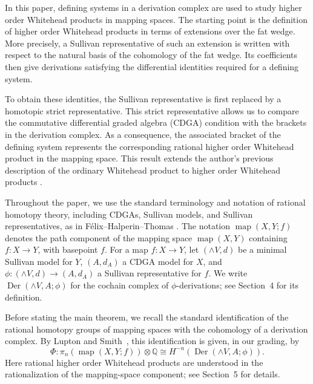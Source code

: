 \documentclass[a4paper,10pt]{amsart}
\theoremstyle{definition}
\theoremstyle{remark}
\newcommand{\map}{\operatorname{map}}
\newcommand{\Der}{\operatorname{Der}}
\numberwithin{equation}{section}
\begin{document}
In this paper, defining systems in a derivation complex are used to study higher order Whitehead products in mapping spaces. The starting point is the definition of higher order Whitehead products in terms of extensions over the fat wedge. 
More precisely, a Sullivan representative of such an extension is written with respect to the natural basis of the cohomology of the fat wedge.
Its coefficients then give derivations satisfying the differential identities
required for a defining system.

To obtain these identities, the Sullivan representative is first replaced by a homotopic strict representative. 
This strict representative allows us to compare the commutative differential graded algebra (CDGA) condition with the brackets in the derivation complex.
As a consequence, the associated bracket of the defining system represents the corresponding rational
higher order Whitehead product in the mapping space.
This result extends the author's previous description of the ordinary Whitehead product to higher order
Whitehead products \cite{Na2014}.

Throughout the paper, we use the standard terminology and notation of rational homotopy theory, including CDGAs, Sullivan models, and Sullivan representatives,
as in F{\'e}lix--Halperin--Thomas \cite{FHT}. The notation
$\map(X,Y;f)$ denotes the path component of the mapping space $\map(X,Y)$
containing $f:X\to Y$, with basepoint $f$.
For a map $f:X\to Y$, let $(\wedge V,d)$ be a minimal Sullivan model for
$Y$, $(A,d_A)$ a CDGA model for $X$, and
$
        \phi:(\wedge V,d)\to(A,d_A)
$
a Sullivan representative for $f$.
We write $\Der(\wedge V,A;\phi)$ for the cochain complex of $\phi$-derivations; see Section~4 for its definition.

Before stating the main theorem, we recall the standard identification of the
rational homotopy groups of mapping spaces with the cohomology of a derivation
complex. By Lupton and Smith~\cite[Theorem~2.1]{LS2007}, this identification is
given, in our grading, by
\[
        \Phi:\pi_n(\map(X,Y;f))\otimes\mathbb{Q}
        \cong
        H^{-n}(\Der(\wedge V,A;\phi)).
\]
Here rational higher order Whitehead products are understood in the
rationalization of the mapping-space component; see Section~5 for details.
\end{document}
